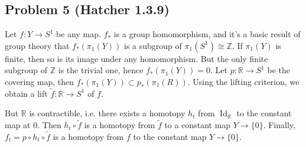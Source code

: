 \documentclass[12 pt]{article}
\newcommand{\R}{\mathbb{R}}
\newcommand{\Z}{\mathbb{Z}}
\DeclareMathOperator{\id}{Id}
\begin{document}
\subsection*{Problem 5 (Hatcher 1.3.9)}
Let $f:Y \to S^1$ be any map. $f_*$ is a group homomorphism, and it's a basic result of group theory that $f_*(\pi_1(Y))$ is a subgroup of $\pi_1(S^1) \cong \Z$. If $\pi_1(Y)$ is finite, then so is its image under any homomorphism. But the only finite subgroup of $\Z$ is the trivial one, hence $f_*(\pi_1(Y)) = 0$. Let $p: \R \to S^1$ be the covering map, then $f_*(\pi_1(Y)) \subset p_*(\pi_1(R))$. Using the lifting criterion, we obtain a lift $\tilde f : \R \to S^1$ of $f$. 

But $\R$ is contractible, i.e. there exists a homotopy $h_t$ from $\id_{\R}$ to the constant map at $0$. Then $h_t \circ \tilde f$ is a homotopy from $\tilde f$ to a constant map $Y \to \{0\}$. Finally, $f_t = p \circ h_t \circ \tilde f$ is a homotopy from $f$ to the constant map $Y \to \{0\}$.
\end{document}
